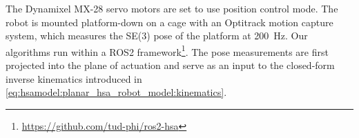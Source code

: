 The Dynamixel MX-28 servo motors are set to use position control mode. %
The robot is mounted platform-down on a cage with an Optitrack motion capture system, which measures the SE(3) pose of the platform at \SI{200}{Hz}.
Our algorithms run within a ROS2 framework\footnote{\url{https://github.com/tud-phi/ros2-hsa}}. %
The pose measurements are first projected into the plane of actuation and serve as an input to the closed-form inverse kinematics introduced in \eqref{eq:hsamodel:planar_hsa_robot_model:kinematics}. 

